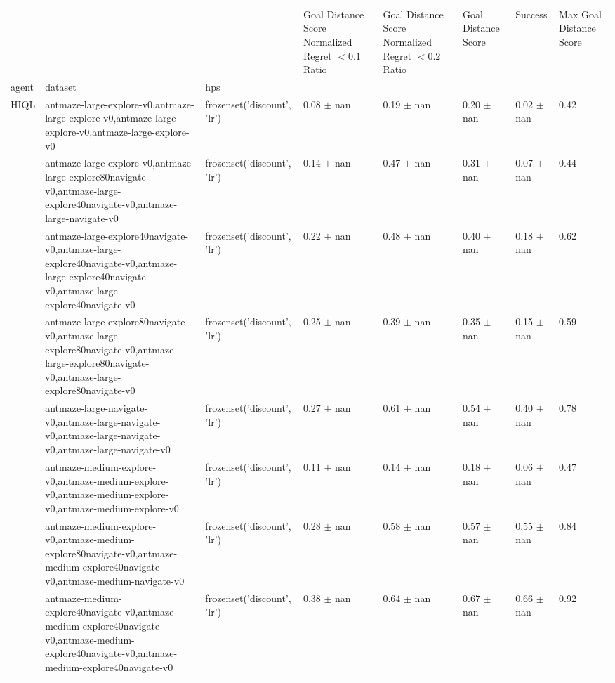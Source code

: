 \begin{tabular}{llllllll}
\toprule
 &  &  & Goal Distance Score Normalized Regret $< 0.1$ Ratio & Goal Distance Score Normalized Regret $< 0.2$ Ratio & Goal Distance Score & Success & Max Goal Distance Score \\
agent & dataset & hps &  &  &  &  &  \\
\midrule
\multirow[t]{10}{*}{HIQL} & antmaze-large-explore-v0,antmaze-large-explore-v0,antmaze-large-explore-v0,antmaze-large-explore-v0 & frozenset({'discount', 'lr'}) & 0.08 $\pm$ nan & 0.19 $\pm$ nan & 0.20 $\pm$ nan & 0.02 $\pm$ nan & 0.42 \\
\cline{2-8}
 & antmaze-large-explore-v0,antmaze-large-explore80navigate-v0,antmaze-large-explore40navigate-v0,antmaze-large-navigate-v0 & frozenset({'discount', 'lr'}) & 0.14 $\pm$ nan & 0.47 $\pm$ nan & 0.31 $\pm$ nan & 0.07 $\pm$ nan & 0.44 \\
\cline{2-8}
 & antmaze-large-explore40navigate-v0,antmaze-large-explore40navigate-v0,antmaze-large-explore40navigate-v0,antmaze-large-explore40navigate-v0 & frozenset({'discount', 'lr'}) & 0.22 $\pm$ nan & 0.48 $\pm$ nan & 0.40 $\pm$ nan & 0.18 $\pm$ nan & 0.62 \\
\cline{2-8}
 & antmaze-large-explore80navigate-v0,antmaze-large-explore80navigate-v0,antmaze-large-explore80navigate-v0,antmaze-large-explore80navigate-v0 & frozenset({'discount', 'lr'}) & 0.25 $\pm$ nan & 0.39 $\pm$ nan & 0.35 $\pm$ nan & 0.15 $\pm$ nan & 0.59 \\
\cline{2-8}
 & antmaze-large-navigate-v0,antmaze-large-navigate-v0,antmaze-large-navigate-v0,antmaze-large-navigate-v0 & frozenset({'discount', 'lr'}) & 0.27 $\pm$ nan & 0.61 $\pm$ nan & 0.54 $\pm$ nan & 0.40 $\pm$ nan & 0.78 \\
\cline{2-8}
 & antmaze-medium-explore-v0,antmaze-medium-explore-v0,antmaze-medium-explore-v0,antmaze-medium-explore-v0 & frozenset({'discount', 'lr'}) & 0.11 $\pm$ nan & 0.14 $\pm$ nan & 0.18 $\pm$ nan & 0.06 $\pm$ nan & 0.47 \\
\cline{2-8}
 & antmaze-medium-explore-v0,antmaze-medium-explore80navigate-v0,antmaze-medium-explore40navigate-v0,antmaze-medium-navigate-v0 & frozenset({'discount', 'lr'}) & 0.28 $\pm$ nan & 0.58 $\pm$ nan & 0.57 $\pm$ nan & 0.55 $\pm$ nan & 0.84 \\
\cline{2-8}
 & antmaze-medium-explore40navigate-v0,antmaze-medium-explore40navigate-v0,antmaze-medium-explore40navigate-v0,antmaze-medium-explore40navigate-v0 & frozenset({'discount', 'lr'}) & 0.38 $\pm$ nan & 0.64 $\pm$ nan & 0.67 $\pm$ nan & 0.66 $\pm$ nan & 0.92 \\

\end{tabular}
